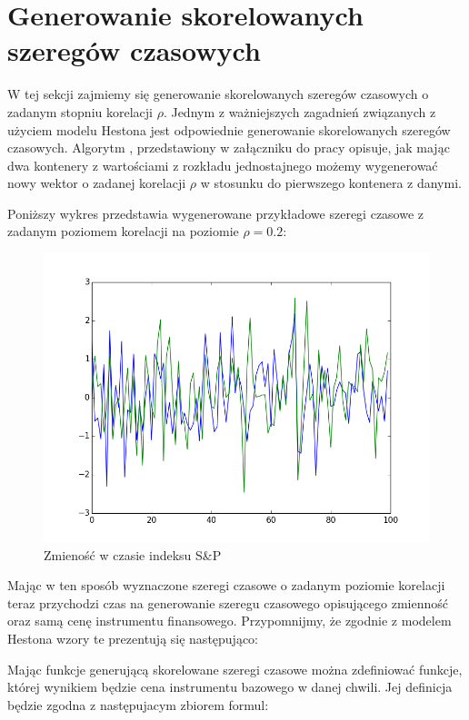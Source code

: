 \documentclass{pracamgr}
\begin{document}
\section{Generowanie skorelowanych szeregów czasowych}
W tej sekcji zajmiemy się generowanie skorelowanych szeregów czasowych o zadanym stopniu korelacji $\rho$.
Jednym z ważniejszych zagadnień związanych z użyciem modelu Hestona jest odpowiednie generowanie skorelowanych szeregów czasowych. Algorytm , przedstawiony w załączniku do pracy opisuje, jak mając dwa kontenery z wartościami z rozkładu jednostajnego możemy wygenerować nowy wektor o zadanej korelacji $\rho$ w stosunku do pierwszego kontenera z danymi. 

Poniższy wykres przedstawia wygenerowane przykładowe szeregi czasowe z zadanym poziomem korelacji na poziomie $\rho = 0.2$:

\begin{figure}
  \centering
  \includegraphics[width=150mm]{corr.png}
  \caption{Zmieność w czasie indeksu S\&P}\label{fig:vix}
\end{figure}

Mając w ten sposób wyznaczone szeregi czasowe o zadanym poziomie korelacji teraz przychodzi czas na generowanie szeregu czasowego opisującego zmienność oraz samą cenę instrumentu finansowego. 
Przypomnijmy, że zgodnie z modelem Hestona wzory te prezentują się następująco:

Mając funkcje generującą skorelowane szeregi czasowe można zdefiniować funkcje, której wynikiem będzie cena instrumentu bazowego w danej chwili. Jej definicja będzie zgodna z następujacym zbiorem formul: \cite{OptimalInvestment2010}
\end{document}

